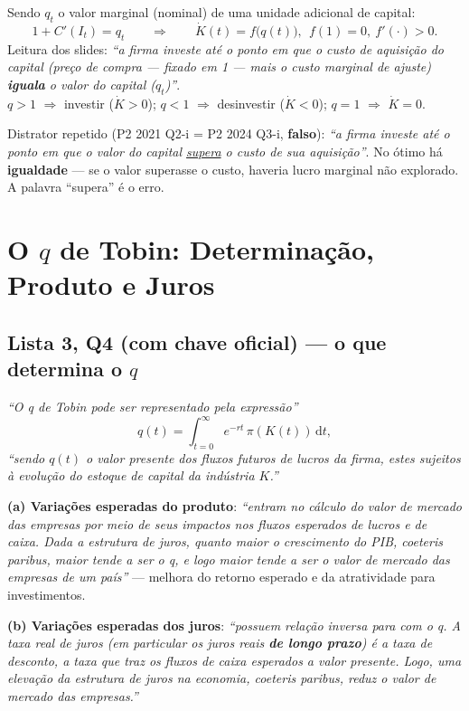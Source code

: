 \documentclass[12pt, a4paper]{article}
\newcommand{\dif}{\mathrm{d}}
\begin{document}
\begin{formulabox}[title={Condição de otimalidade e investimento agregado}]
Sendo $q_t$ o valor marginal (nominal) de uma unidade adicional de capital:
\[
1 + C'(I_t) = q_t
\qquad\Longrightarrow\qquad
\dot{K}(t) = f\bigl(q(t)\bigr),\ \ f(1) = 0,\ f'(\cdot)>0.
\]
Leitura dos slides: \emph{``a firma investe até o ponto em que o custo de
aquisição do capital (preço de compra --- fixado em 1 --- mais o custo
marginal de ajuste) \textbf{iguala} o valor do capital ($q_t$)''}.\\[0.3em]
$q>1$ $\Rightarrow$ investir ($\dot K > 0$);\quad
$q<1$ $\Rightarrow$ desinvestir ($\dot K < 0$);\quad
$q=1$ $\Rightarrow$ $\dot K = 0$.
\end{formulabox}

\begin{provabox}[title={Como cai na prova}]
Distrator repetido (P2 2021 Q2-i = P2 2024 Q3-i, \textbf{falso}): \emph{``a
firma investe até o ponto em que o valor do capital \underline{supera} o custo
de sua aquisição''}. No ótimo há \textbf{igualdade} --- se o valor superasse o
custo, haveria lucro marginal não explorado. A palavra ``supera'' é o erro.
\end{provabox}

\section{O $q$ de Tobin: Determinação, Produto e Juros}

\subsection{Lista 3, Q4 (com chave oficial) --- o que determina o $q$}

\begin{correctbox}[title={Chave oficial (Q4): definição e os dois canais}]
\emph{``O q de Tobin pode ser representado pela expressão''}
\[
q(t) = \int_{t=0}^{\infty} e^{-rt}\,\pi(K(t))\,\dif t,
\]
\emph{``sendo $q(t)$ o valor presente dos fluxos futuros de lucros da firma,
estes sujeitos à evolução do estoque de capital da indústria $K$.''}

\textbf{(a) Variações esperadas do produto}: \emph{``entram no cálculo do valor
de mercado das empresas por meio de seus impactos nos fluxos esperados de
lucros e de caixa. Dada a estrutura de juros, quanto maior o crescimento do
PIB, coeteris paribus, maior tende a ser o q, e logo maior tende a ser o valor
de mercado das empresas de um país''} --- melhora do retorno esperado e da
atratividade para investimentos.

\textbf{(b) Variações esperadas dos juros}: \emph{``possuem relação inversa
para com o q. A taxa real de juros (em particular os juros reais \textbf{de
longo prazo}) é a taxa de desconto, a taxa que traz os fluxos de caixa
esperados a valor presente. Logo, uma elevação da estrutura de juros na
economia, coeteris paribus, reduz o valor de mercado das empresas.''}
\end{correctbox}
\end{document}
